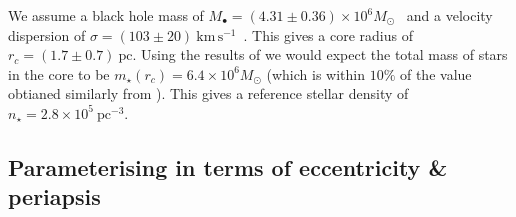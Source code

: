 \documentclass[useAMS,usedcolumn,usegraphicx,usenatbib]{mn2e}
\newcommand{\units}[1]{\ensuremath{~\mathrm{#1}}}
\begin{document}
We assume a black hole mass of $M_\bullet = (4.31 \pm 0.36) \times 10^6 M_\odot$~\citep{Gillessen2009} and a velocity dispersion of $\sigma = (103 \pm 20)\units{km\,s^{-1}}$~\citep{Tremaine2002}. This gives a core radius of $r_c = (1.7 \pm 0.7)\units{pc}$. Using the results of \citet{Ghez2008} we would expect the total mass of stars in the core to be $m_\star(r_c) = 6.4 \times 10^6 M_\odot$ (which is within $10\%$ of the value obtianed similarly from \citealt{Genzel2003}). This gives a reference stellar density of $n_\star = 2.8 \times 10^5\units{pc^{-3}}$.

\subsection{Parameterising in terms of eccentricity \& periapsis}
\end{document}
